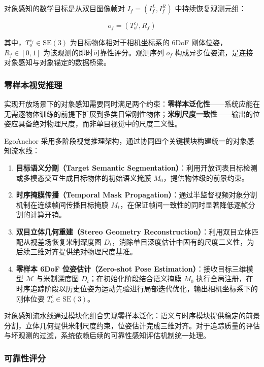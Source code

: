 \documentclass[review]{vgtc}
\begin{document}
对象感知的数学目标是从双目图像帧对 $I_f = (I_f^L, I_f^R)$ 中持续恢复观测元组：

\begin{equation}
o_f = (T_o^{c_f}, R_f)
\label{eq:observation}
\end{equation}


其中，$T_o^{c_f} \in \mathrm{SE}(3)$ 为目标物体相对于相机坐标系的 6DoF 刚体位姿，$R_f \in [0,1]$ 为该观测的即时可靠性评分。观测序列 ${o_f}$ 构成异步位姿流，是连接对象感知与对象锚定的数据桥梁。

\subsubsection{零样本视觉推理}\label{sec:pipeline-detail}


实现开放场景下的对象感知需要同时满足两个约束：\textbf{零样本泛化性}------系统应能在无需逐物体训练的前提下扩展到多类日常刚性物体；\textbf{米制尺度一致性}------输出的位姿应具备绝对物理尺度，而非单目视觉中的尺度二义性。

EgoAnchor 采用多阶段视觉推理架构，通过协同四个关键模块构建统一的对象感知流水线：

\begin{enumerate}
  \item \textbf{目标语义分割（Target Semantic Segmentation）}：利用开放词表目标检测或多模态交互生成目标物体的初始语义掩膜 $M_0$，提供物体级的前景约束。
  \item \textbf{时序掩膜传播（Temporal Mask Propagation）}：通过半监督视频对象分割机制在连续帧间传播目标掩膜 $M_t$，在保证帧间一致性的同时显著降低逐帧分割的计算开销。
  \item \textbf{双目立体几何重建（Stereo Geometry Reconstruction）}：利用双目立体匹配从视差场恢复米制深度图 $D_t$，消除单目深度估计中固有的尺度二义性，为后续三维对齐提供绝对物理尺度基准。
  \item \textbf{零样本 6DoF 位姿估计（Zero-shot Pose Estimation）}：接收目标三维模型 $\mathcal{M}$ 与米制深度图 $D_t$；在初始化阶段结合语义掩膜 $M_0$ 执行全局注册，在时序追踪阶段以历史位姿为运动先验进行局部迭代优化，输出相机坐标系下的刚体位姿 $T_o^c \in \mathrm{SE}(3)$。
\end{enumerate}

对象感知流水线通过模块化组合实现零样本泛化：语义与时序模块提供稳定的前景分割，立体几何提供米制尺度约束，位姿估计完成三维对齐。对于追踪质量的评估与坏观测的过滤，系统依赖后续的可靠性感知评估机制统一处理。

\subsubsection{可靠性评分}\label{sec:reliability}
\end{document}
